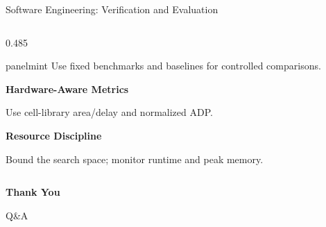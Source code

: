 \documentclass[aspectratio=169,10pt]{beamer}
\begin{document}
\begin{frame}{Software Engineering: Verification and Evaluation}
\begin{columns}[T,onlytextwidth]
\begin{column}{0.485\textwidth}
\begin{beamercolorbox}[rounded=true,sep=0.19cm,wd=\linewidth]{panelmint}
        {\small Use fixed benchmarks and baselines for controlled comparisons.}\par
        \vspace{0.12cm}
        {\small\bfseries Hardware-Aware Metrics}\par
        {\small Use cell-library area/delay and normalized ADP.}\par
        \vspace{0.12cm}
        {\small\bfseries Resource Discipline}\par
        {\small Bound the search space; monitor runtime and peak memory.}
      \end{beamercolorbox}
    \end{column}
  \end{columns}
\end{frame}

{
\begin{frame}[plain]
  \vfill
  \begin{center}
    {\fontsize{34}{43}\selectfont\bfseries\color{Ink}Thank You}\par
    \vspace{0.28cm}
    {\Large\color{Accent}Q\&A}\par
  \end{center}
  \vfill
\end{frame}}
\end{document}
